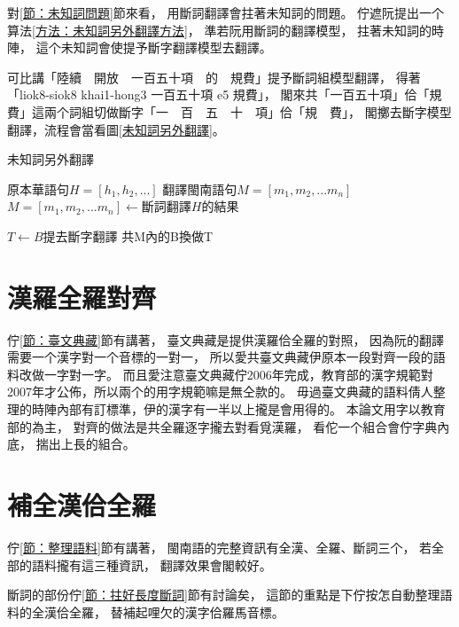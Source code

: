 對\ref{節：未知詞問題}節來看，
用斷詞翻譯會拄著未知詞的問題。
佇遮阮提出一个算法\ref{方法：未知詞另外翻譯方法}，
準若阮用斷詞的翻譯模型，
拄著未知詞的時陣，
這个未知詞會使提予斷字翻譯模型去翻譯。

可比講「陸續　開放　一百五十項　的　規費」提予斷詞組模型翻譯，
得著「liok8-siok8 khai1-hong3 一百五十項 e5 規費」，
閣來共「一百五十項」佮「規費」這兩个詞組切做斷字「一　百　五　十　項」佮「規　費」，
閣擲去斷字模型翻譯，流程會當看圖\ref{未知詞另外翻譯}。

\begin{algorithm}
  \caption{未知詞另外翻譯}
  \label{方法：未知詞另外翻譯方法}
  \begin{algorithmic}
    \REQUIRE \( 原本華語句H = [h_{1}, h_{2},...] \)
    \ENSURE \( 翻譯閩南語句M = [m_{1}, m_{2},...m_{n}] \)
    \STATE \( M = [m_{1}, m_{2},...m_{n}] \gets 斷詞翻譯H的結果 \)
    
		\STATE \( T \gets B提去斷字翻譯 \)
		\STATE 共M內的B換做T
	\ENDWHILE
  \end{algorithmic}
\end{algorithm}


\section{漢羅全羅對齊}
\label{節：漢羅全羅對齊}
佇\ref{節：臺文典藏}節有講著，
臺文典藏是提供漢羅佮全羅的對照，
因為阮的翻譯需要一个漢字對一个音標的一對一，
所以愛共臺文典藏伊原本一段對齊一段的語料改做一字對一字。
而且愛注意臺文典藏佇2006年完成，教育部的漢字規範對2007年才公佈，所以兩个的用字規範嘛是無仝款的。
毋過臺文典藏的語料倩人整理的時陣內部有訂標準，伊的漢字有一半以上攏是會用得的。
本論文用字以教育部的為主，
對齊的做法是共全羅逐字攏去對看覓漢羅，
看佗一个組合會佇字典內底，
揣出上長的組合。


\section{補全漢佮全羅}
\label{節：補全漢佮全羅}
佇\ref{節：整理語料}節有講著，
閩南語的完整資訊有全漢、全羅、斷詞三个，
若全部的語料攏有這三種資訊，
翻譯效果會閣較好。

斷詞的部份佇\ref{節：拄好長度斷詞}節有討論矣，
這節的重點是下佇按怎自動整理語料的全漢佮全羅，
替補起哩欠的漢字佮羅馬音標。

